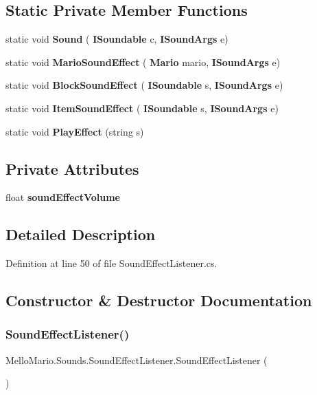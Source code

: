 \subsection*{Static Private Member Functions}
\begin{DoxyCompactItemize}
\item 
static void \textbf{ Sound} (\textbf{ I\+Soundable} c, \textbf{ I\+Sound\+Args} e)
\item 
static void \textbf{ Mario\+Sound\+Effect} (\textbf{ Mario} mario, \textbf{ I\+Sound\+Args} e)
\item 
static void \textbf{ Block\+Sound\+Effect} (\textbf{ I\+Soundable} s, \textbf{ I\+Sound\+Args} e)
\item 
static void \textbf{ Item\+Sound\+Effect} (\textbf{ I\+Soundable} s, \textbf{ I\+Sound\+Args} e)
\item 
static void \textbf{ Play\+Effect} (string s)
\end{DoxyCompactItemize}
\subsection*{Private Attributes}
\begin{DoxyCompactItemize}
\item 
float \textbf{ sound\+Effect\+Volume}
\end{DoxyCompactItemize}


\subsection{Detailed Description}


Definition at line 50 of file Sound\+Effect\+Listener.\+cs.



\subsection{Constructor \& Destructor Documentation}
\mbox{\label{classMelloMario_1_1Sounds_1_1SoundEffectListener_aa037a6e7c41b3a1d358ff3987188a66c}} 
\subsubsection{Sound\+Effect\+Listener()}
{\footnotesize\ttfamily Mello\+Mario.\+Sounds.\+Sound\+Effect\+Listener.\+Sound\+Effect\+Listener (\begin{DoxyParamCaption}{ }\end{DoxyParamCaption})}



